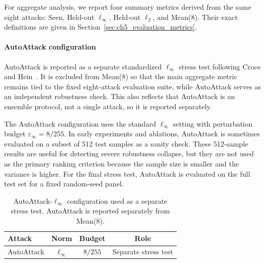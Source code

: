 For aggregate analysis, we report four summary metrics derived from the same eight
attacks: Seen, Held-out \(\ell_\infty\), Held-out \(\ell_2\), and Mean(8). Their exact
definitions are given in Section~\ref{sec:ch5_evaluation_metrics}.

\paragraph{AutoAttack configuration}

AutoAttack is reported as a separate standardized $\ell_\infty$ stress test following
Croce and Hein~\cite{croce2020reliable}. It is excluded from Mean(8) so that the main
aggregate metric remains tied to the fixed eight-attack evaluation suite, while
AutoAttack serves as an independent robustness check. This also reflects that AutoAttack is an ensemble protocol, not a single attack, so it is reported separately.

The AutoAttack configuration uses the standard \(\ell_\infty\) setting with perturbation
budget \(\varepsilon_\infty = 8/255\). In early experiments and ablations, AutoAttack is
sometimes evaluated on a subset of 512 test samples as a sanity check. These 512-sample
results are useful for detecting severe robustness collapse, but they are not used as the
primary ranking criterion because the sample size is smaller and the variance is higher.
For the final stress test, AutoAttack is evaluated on the full test set for a fixed
random-seed panel.

\begin{table}[H]
\centering
\caption[AutoAttack configuration]{AutoAttack-$\ell_\infty$ configuration used as a separate stress test. AutoAttack is reported separately from Mean(8).}
\label{tab:ch5_autoattack_config}
\renewcommand{\arraystretch}{1.08}
\setlength{\tabcolsep}{10pt}
\begin{tabular}{lccc}
\toprule
Attack & Norm & Budget & Role \\
\midrule
AutoAttack & $\ell_\infty$ & $8/255$ & Separate stress test \\
\bottomrule
\end{tabular}
\end{table}
